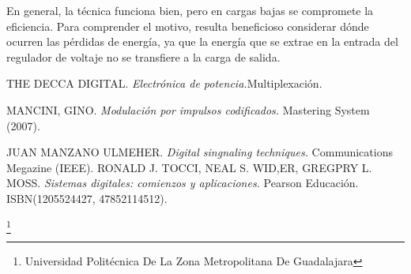 \documentclass[11pt,a4paper]{article}
\begin{document}
En general, la técnica funciona bien, pero en cargas bajas se compromete la eficiencia. Para comprender el motivo, resulta beneficioso considerar dónde ocurren las pérdidas de energía, ya que la energía que se extrae en la entrada del regulador de voltaje no se transfiere a la carga de salida. 



\begin{thebibliography}{X}
 \textsc{THE DECCA DIGITAL.} \textit{Electrónica de  potencia.}Multiplexación.

 \textsc{MANCINI, GINO.} \textit{Modulación por impulsos codificados.} 
Mastering System (2007).


 \textsc{JUAN MANZANO ULMEHER.} \textit{Digital singnaling techniques.} 
Communications Megazine (IEEE).
 \textsc{RONALD J. TOCCI, NEAL S. WID,ER, GREGPRY L. MOSS.} \textit{Sistemas digitales: comienzos y aplicaciones.} 
Pearson Educación. ISBN(1205524427, 47852114512).

\end{thebibliography}






\footnote{Universidad Politécnica De La Zona Metropolitana De Guadalajara} 
\end{document}
